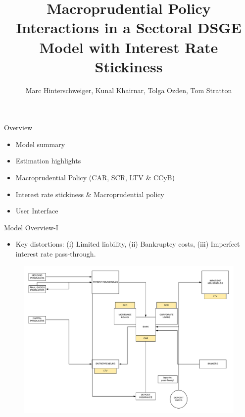 \documentclass[8pt,aspectratio=169]{beamer}
\title{\bf Macroprudential Policy Interactions in a Sectoral DSGE Model with Interest Rate Stickiness}
\author{Marc Hinterschweiger, Kunal Khairnar, Tolga Ozden, Tom Stratton}
\numberwithin{equation}{section}
\begin{document}
\titlepage
\begin{frame}{Overview}




\begin{itemize}

\item Model summary
\vspace{5 mm}
\item Estimation highlights
\vspace{5 mm}
\item Macroprudential Policy (CAR, SCR, LTV \& CCyB)
\vspace{5 mm}
\item Interest rate stickiness \& Macroprudential policy
\vspace{5 mm}
\item User Interface
\end{itemize}


\end{frame}


\begin{frame}{Model Overview-I}

\begin{itemize}
\item Key distortions:
(i) Limited liability,
(ii) Bankruptcy costs,
(iii) Imperfect interest rate pass-through.
\end{itemize}

\begin{figure}
\includegraphics[scale=0.4]{3d_flowchart_prud.pdf}
\end{figure}



\end{frame}
\end{document}

